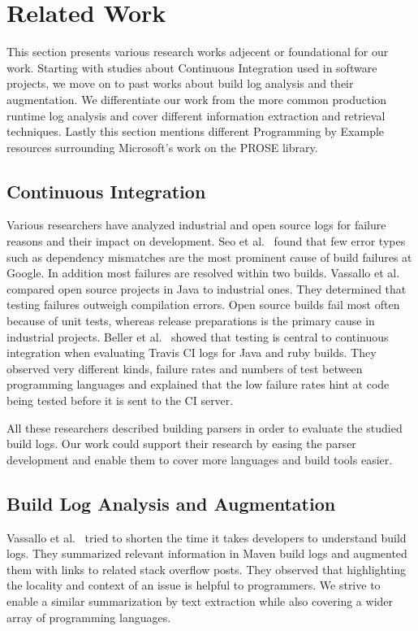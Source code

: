 \documentclass[\myrootdir/main.tex]{subfiles}
\begin{document}
\chapter{Related Work}
\label{sec:rw}
This section presents various research works adjecent or foundational for our work. Starting with studies about Continuous Integration used in software projects, we move on to past works about build log analysis and their augmentation. We differentiate our work from the more common production runtime log analysis and cover different information extraction and retrieval techniques. Lastly this section mentions different Programming by Example resources surrounding Microsoft's work on the PROSE library.

\section{Continuous Integration}
Various researchers have analyzed industrial and open source logs for failure reasons and their impact on development. Seo et al.~\cite{seo2014programmers} found that few error types such as dependency mismatches are the most prominent cause of build failures at Google. In addition most failures are resolved within two builds. Vassallo et al.~\cite{vassallo2017a-tale} compared open source projects in Java to industrial ones. They determined that testing failures outweigh compilation errors. Open source builds fail most often because of unit tests, whereas release preparations is the primary cause in industrial projects. Beller et al.~\cite{beller2017oops} showed that testing is central to continuous integration when evaluating Travis CI logs for Java and ruby builds. They observed very different kinds, failure rates and numbers of test between programming languages and explained that the low failure rates hint at code being tested before it is sent to the CI server.

All these researchers described building parsers in order to evaluate the studied build logs. Our work could support their research by easing the parser development and enable them to cover more languages and build tools easier.

\section{Build Log Analysis and Augmentation}
Vassallo et al.~\cite{vassallo2018un-break} tried to shorten the time it takes developers to understand build logs. They summarized relevant information in Maven build logs and augmented them with links to related stack overflow posts. They observed that highlighting the locality and context of an issue is helpful to programmers. We strive to enable a similar summarization by text extraction while also covering a wider array of programming languages.
\end{document}
